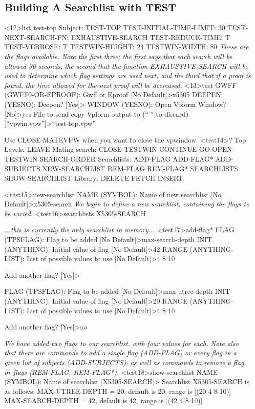 \subsection{Building A Searchlist with TEST}
\begin{tpsexample}
<12>list test-top
Subject: TEST-TOP
  TEST-INITIAL-TIME-LIMIT: 30
  TEST-NEXT-SEARCH-FN:   EXHAUSTIVE-SEARCH
  TEST-REDUCE-TIME:      T
  TEST-VERBOSE:          T
  TESTWIN-HEIGHT:        24
  TESTWIN-WIDTH:         80
{\it These are the flags available. Note the first three; the first says that
each search will be allowed 30 seconds, the second that the function
EXHAUSTIVE-SEARCH will be used to determine which flag settings are used next,
and the third that if a proof is found, the time allowed for the next proof
will be decreased.}
<13>test
GWFF (GWFF0-OR-EPROOF): Gwff or Eproof [No Default]>x5305
DEEPEN (YESNO): Deepen? [Yes]>
WINDOW (YESNO): Open Vpform Window? [No]>yes
File to send copy Vpform output to (`` '' to discard) [``vpwin.vpw'']>``test-top.vpw''

Use CLOSE-MATEVPW when you want to close the vpwindow.
<test14>?
Top Levels:    LEAVE
Mating search: CLOSE-TESTWIN CONTINUE GO OPEN-TESTWIN SEARCH-ORDER
Searchlists:   ADD-FLAG ADD-FLAG* ADD-SUBJECTS NEW-SEARCHLIST REM-FLAG
               REM-FLAG* SEARCHLISTS SHOW-SEARCHLIST
Library:       DELETE FETCH INSERT

<test15>new-searchlist
NAME (SYMBOL): Name of new searchlist [No Default]>x5305-search
{\it We begin to define a new searchlist, containing the flags to be varied.}
<test16>searchlists
X5305-SEARCH

{\it ...this is currently the only searchlist in memory...}
<test17>add-flag*
FLAG (TPSFLAG): Flag to be added [No Default]>max-search-depth
INIT (ANYTHING): Initial value of flag [No Default]>42
RANGE (ANYTHING-LIST): List of possible values to use [No Default]>4 8 10

Add another flag?  [Yes]>

FLAG (TPSFLAG): Flag to be added [No Default]>max-utree-depth
INIT (ANYTHING): Initial value of flag [No Default]>20
RANGE (ANYTHING-LIST): List of possible values to use [No Default]>4 8 10

Add another flag?  [Yes]>no

{\it We have added two flags to our searchlist, with four values for each.
Note also that there are commands to add a single flag (ADD-FLAG) or
every flag in a given list of subjects (ADD-SUBJECTS), as well as
commands to remove a flag or flags (REM-FLAG, REM-FLAG*).}
<test18>show-searchlist
NAME (SYMBOL): Name of searchlist [X5305-SEARCH]>
Searchlist X5305-SEARCH is as follows:
MAX-UTREE-DEPTH = 20, default is 20, range is [(20 4 8 10)]
MAX-SEARCH-DEPTH = 42, default is 42, range is [(42 4 8 10)]


\end{tpsexample}

